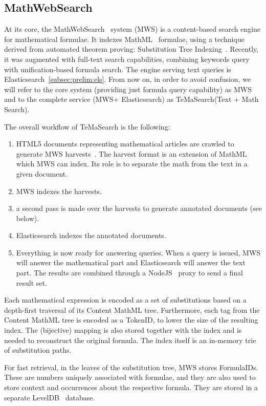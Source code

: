 \documentclass[a4paper,oneside]{article}
\def\MWS{\textsf{MWS}\xspace}
\def\mws{\textsf{MathWebSearch}\xspace}
\def\tms{\textsf{TeMaSearch}\xspace}
\def\els{\textsf{Elasticsearch}\xspace}
\def\cmml{\textsf{Content MathML}\xspace}
\def\mathml{\textsf{MathML}\xspace}
\begin{document}
\subsection{MathWebSearch}\label{subsec:prelim:mws}

At its core, the \mws~\cite{ProKoh:mwsofse11} system (MWS) is a content-based
search engine for mathematical formulae. It indexes MathML~\cite{mathml:online}
formulae, using a technique derived from automated theorem proving:
Substitution Tree Indexing~\cite{Graf94}. Recently, it was augmented with
full-text search capabilities, combining keywords query with unification-based
formula search. The engine serving text queries is
\els~\ref{subsec:prelim:els}.  From now on, in order to avoid confusion, we
will refer to the core system (providing just formula query capability) as \MWS
and to the complete service (\MWS + \els) as \tms (Text + Math Search).

The overall workflow of \tms is the following:
\begin{enumerate}
    \item HTML5 documents representing mathematical articles are
        crawled to generate \MWS harvests~\cite{mwsharvest:online}.
        The \textsf{harvest} format is an extension of \mathml which \MWS can
        index. Its role is to separate the math from the text in a given
        document.
    \item \MWS indexes the harvests.
    \item a second pass is made over the harvests to generate annotated
        documents (see below).
    \item \els indexes the annotated documents.
    \item Everything is now ready for answering queries. When a query is
        issued, \MWS will answer the mathematical part and \els will answer the
        text part.  The results are combined through a
        NodeJS~\cite{nodejs:online} proxy to send a final result set.
\end{enumerate}

Each mathematical expression is encoded as a set of substitutions based
on a depth-first traversal of its \cmml tree.
Furthermore, each tag from the \cmml tree is encoded as a \textsf{TokenID},
to lower the size of the resulting index. The (bijective) mapping is also
stored together with the index and is needed to reconstruct the original
formula. The index itself is an in-memory trie of substitution paths.

For fast retrieval, in the leaves of the substitution tree, \MWS stores
\textsf{FormulaID}s. These are numbers uniquely associated with formulae,
and they are also used to store context and occurrences about the respective
formula. They are stored in a separate LevelDB~\cite{leveldb:online} database.
\end{document}
